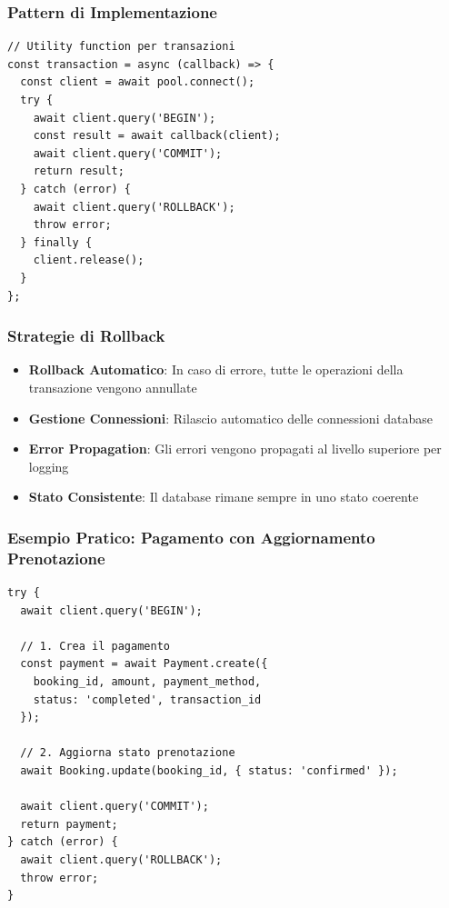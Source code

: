 \subsubsection{Pattern di Implementazione}
\begin{lstlisting}[caption=Esempio Transazione Automatica]
// Utility function per transazioni
const transaction = async (callback) => {
  const client = await pool.connect();
  try {
    await client.query('BEGIN');
    const result = await callback(client);
    await client.query('COMMIT');
    return result;
  } catch (error) {
    await client.query('ROLLBACK');
    throw error;
  } finally {
    client.release();
  }
};
\end{lstlisting}

\subsubsection{Strategie di Rollback}
\begin{itemize}
\item \textbf{Rollback Automatico}: In caso di errore, tutte le operazioni della transazione vengono annullate
\item \textbf{Gestione Connessioni}: Rilascio automatico delle connessioni database
\item \textbf{Error Propagation}: Gli errori vengono propagati al livello superiore per logging
\item \textbf{Stato Consistente}: Il database rimane sempre in uno stato coerente
\end{itemize}

\subsubsection{Esempio Pratico: Pagamento con Aggiornamento Prenotazione}
\begin{lstlisting}[caption=Transazione Pagamento Completa]
try {
  await client.query('BEGIN');
  
  // 1. Crea il pagamento
  const payment = await Payment.create({
    booking_id, amount, payment_method, 
    status: 'completed', transaction_id
  });
  
  // 2. Aggiorna stato prenotazione
  await Booking.update(booking_id, { status: 'confirmed' });
  
  await client.query('COMMIT');
  return payment;
} catch (error) {
  await client.query('ROLLBACK');
  throw error;
}
\end{lstlisting}

